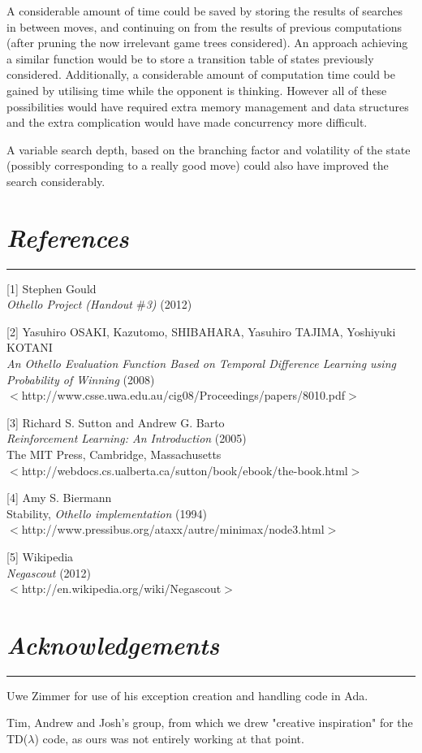 \documentclass[10pt]{report}
\begin{document}
\begin{multicols}{2}
A considerable amount of time could be saved by storing the results of searches in between moves, and continuing on from the results of previous computations (after pruning the now irrelevant game trees considered). An approach achieving a similar function would be to store a transition table of states previously considered. Additionally, a considerable amount of computation time could be gained by utilising time while the opponent is thinking. However all of these possibilities would have required extra memory management and data structures and the extra complication would have made concurrency more difficult.

A variable search depth, based on the branching factor and volatility of the state (possibly corresponding to a really good move) could also have improved the search considerably. 
\end{multicols}
\newpage
\section*{\emph{References}}
\hrule

[1]
Stephen Gould\\
\emph{Othello Project (Handout $\#$3)} (2012)
  
[2] Yasuhiro OSAKI, Kazutomo, SHIBAHARA, Yasuhiro TAJIMA, Yoshiyuki KOTANI\\
\emph{An Othello Evaluation Function Based on Temporal Difference Learning using Probability of Winning} (2008)\\
$<$http://www.csse.uwa.edu.au/cig08/Proceedings/papers/8010.pdf$>$
  
[3] Richard S. Sutton and Andrew G. Barto\\
\emph{Reinforcement Learning: An Introduction} (2005)\\
The MIT Press, Cambridge, Massachusetts\\
$<$http://webdocs.cs.ualberta.ca/\texttildelow sutton/book/ebook/the-book.html$>$

[4]
Amy S. Biermann\\
Stability, \emph{Othello implementation} (1994)\\
$<$http://www.pressibus.org/ataxx/autre/minimax/node3.html$>$

[5]
Wikipedia\\
\emph{Negascout} (2012)\\
$<$http://en.wikipedia.org/wiki/Negascout$>$

\section*{\emph{\textmd{Acknowledgements}}}
\hrule
\vspace{0.4cm}

Uwe Zimmer for use of his exception creation and handling code in Ada.

Tim, Andrew and Josh's group, from which we drew "creative inspiration" for the TD($\lambda$) code, as ours was not entirely working at that point.
\end{document}

